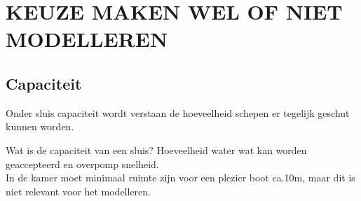\documentclass{article}
\begin{document}
\vskip0.5cm

\section{\large\color{red}\textbf{KEUZE MAKEN WEL OF NIET MODELLEREN}}

\subsection{Capaciteit}
Onder sluis capaciteit wordt verstaan de hoeveelheid schepen er tegelijk geschut kunnen worden.

Wat is de capaciteit van een sluis? Hoeveelheid water wat kan worden geaccepteerd en overpomp snelheid.\\
In de kamer moet minimaal ruimte zijn voor een plezier boot ca.10m, maar dit is niet relevant voor het modelleren.

\clearpage
\end{document}
